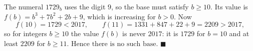 The numeral $1729_b$ uses the digit $9$, so the base must satisfy $b\ge10$. Its value is $f(b)=b^3+7b^2+2b+9$, which is increasing for $b>0$. Now
\[
f(10)=1729<2017,\qquad f(11)=1331+847+22+9=2209>2017,
\]
so for integers $b\ge10$ the value $f(b)$ is never $2017$: it is $1729$ for $b=10$ and at least $2209$ for $b\ge11$. Hence $\boxed{\text{there is no such base}}$. $\blacksquare$
